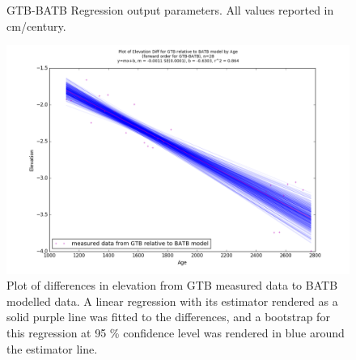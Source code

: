 \begin{figure}[H]
	\begin{flushleft}
	\end{flushleft}
	\caption{GTB-BATB Regression output parameters. All values reported in cm/century.}
	\label{fig:GTBxBATB_regression}
\end{figure}

\newpage

\begin{figure}[H]
	\includegraphics[width=1.3\linewidth, angle=270 ]{data/bothNonZero/withinSeventyFivePercent/gias/theGIA_GTB_relative_to_BATB.png}
	\caption{Plot of differences in elevation from GTB measured data to BATB modelled data. A linear regression with its estimator rendered as
	 a solid purple line was fitted to the differences, and a bootstrap for this regression at 95 \% confidence level was rendered in blue
	 around the estimator line.}
	\label{fig:gias_GTBxBATB}
\end{figure}
\newpage


